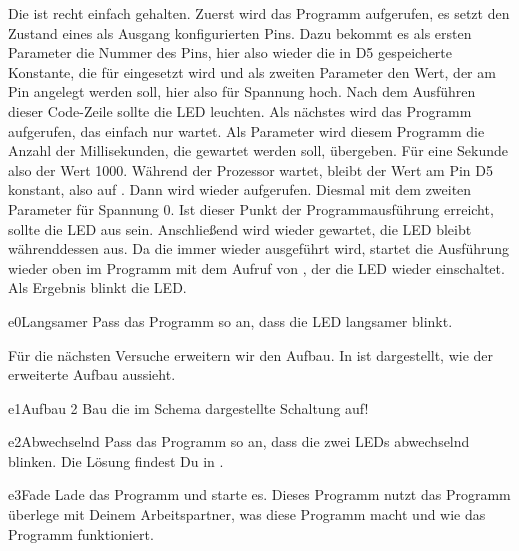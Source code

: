 Die  ist recht einfach gehalten. Zuerst wird das Programm  aufgerufen, es setzt den Zustand eines als
Ausgang konfigurierten Pins. Dazu bekommt es als ersten Parameter die Nummer des Pins,
hier also wieder die in D5 gespeicherte Konstante, die für  eingesetzt wird und als zweiten Parameter den Wert, der am
Pin angelegt werden soll, hier also  für Spannung hoch. Nach dem Ausführen dieser Code-Zeile sollte die LED leuchten.
Als nächstes wird das Programm  aufgerufen, das einfach nur wartet. Als Parameter wird diesem Programm die Anzahl der
Millisekunden, die gewartet werden soll, übergeben. Für eine Sekunde also der Wert 1000. Während der Prozessor wartet, bleibt der
Wert am Pin D5 konstant, also auf .
Dann wird wieder  aufgerufen. Diesmal mit dem zweiten Parameter  für Spannung 0. Ist dieser Punkt der
Programmausführung erreicht, sollte die LED aus sein. Anschließend wird wieder gewartet, die LED bleibt währenddessen aus.
Da die  immer wieder ausgeführt wird, startet die Ausführung wieder oben im Programm mit dem Aufruf von ,
der die LED wieder einschaltet. Als Ergebnis blinkt die LED.

\begin{excercise}{e0}{Langsamer}
Pass das Programm  so an, dass die LED langsamer blinkt.
\end{excercise}


\newpage{}
%
%
%

Für die nächsten Versuche erweitern wir den Aufbau. In  ist dargestellt, wie der erweiterte Aufbau aussieht. 
\begin{excercise}{e1}{Aufbau 2}
Bau die im Schema  dargestellte Schaltung auf!
\end{excercise}

\begin{excercise}{e2}{Abwechselnd}
Pass das Programm  so an, dass die zwei LEDs abwechselnd blinken. Die Lösung findest Du in .
\end{excercise}

\begin{excercise}{e3}{Fade}
Lade das Programm  und starte es. Dieses Programm nutzt das Programm 
überlege mit Deinem Arbeitspartner, was diese Programm macht und wie das Programm  funktioniert.
\end{excercise}


